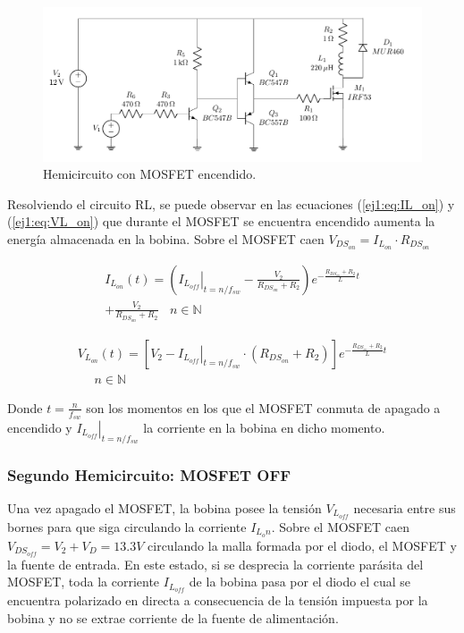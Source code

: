 \begin{figure}[H]
	\centering
	\includegraphics[width=0.4\linewidth, page=3]{ImagenesEjercicio-1/CircuitsEj1}
	\caption{Hemicircuito con MOSFET encendido.}
	\label{ej1:fig:circuito_on}
\end{figure}

Resolviendo el circuito RL, se puede observar en las ecuaciones (\ref{ej1:eq:IL_on}) y (\ref{ej1:eq:VL_on}) que durante el MOSFET se encuentra encendido aumenta la energía almacenada en la bobina. Sobre el MOSFET caen $V_{DS_{on}} = I_{L_{on}}\cdot R_{DS_{on}}$

\begin{equation}
\begin{gathered}
	 I_{L_{on}}(t) = \left( \left. I_{L_{off}} \right|_{t= n/f_{sw}} -\frac{V_2}{R_{DS_{on}}+R_2}\right) e^{-\frac{R_{DS_{on}}+R_2}{L}t} \\ + \frac{V_2}{R_{DS_{on}}+R_2} \ \ \ \ n \in \mathbb{N}
\end{gathered}
\label{ej1:eq:IL_on}
\end{equation}

\begin{equation}
\begin{gathered}
	V_{L_{on}}(t) = \left[ V_2 - \left. I_{L_{off}} \right|_{t= n/f_{sw}}\cdot (R_{DS_{on}}+R_2) \right]e^{-\frac{R_{DS_{on}}+R_2}{L}t} \\ \ \ \ \ \ \ n \in \mathbb{N}
\end{gathered}
\label{ej1:eq:VL_on}
\end{equation}

Donde $t=\frac{n}{f_{sw}}$ son los momentos en los que el MOSFET conmuta de apagado a encendido y $\left. I_{L_{off}} \right|_{t= n/f_{sw}}$ la corriente en la bobina en dicho momento.

\subsubsection{Segundo Hemicircuito: MOSFET OFF}

Una vez apagado el MOSFET, la bobina posee la tensión $V_{L_{off}}$ necesaria entre sus bornes para que siga circulando la corriente $I_{L_on}$. Sobre el MOSFET caen $V_{DS_{off}} = V_2 + V_D = 13.3V$ circulando la malla formada por el diodo, el MOSFET y la fuente de entrada. En este estado, si se desprecia la corriente parásita del MOSFET, toda la corriente $I_{L_{off}}$ de la bobina pasa por el diodo el cual se encuentra polarizado en directa a consecuencia de la tensión impuesta por la bobina y no se extrae corriente de la fuente de alimentación.

